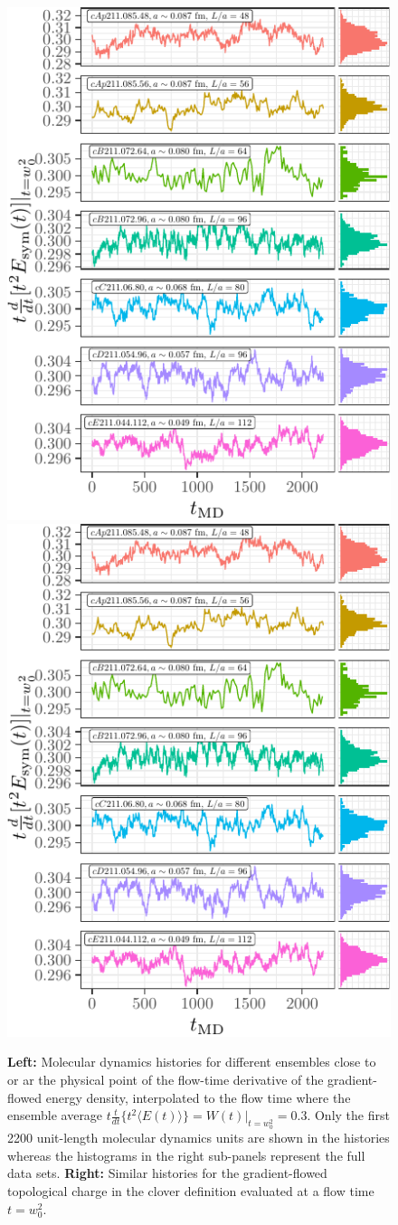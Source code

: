 \documentclass[a4paper,11pt]{article}
\begin{document}
\begin{figure}
  \includegraphics[width=0.49\linewidth,page=1]{../data/gf_observables/gf_observables_md_histories}
  \hfill
  \includegraphics[width=0.49\linewidth,page=2]{../data/gf_observables/gf_observables_md_histories}
  \caption{\textbf{Left:} Molecular dynamics histories for different ensembles close to or ar the physical point of the flow-time derivative of the gradient-flowed energy density, interpolated to the flow time where the ensemble average $t \frac{t}{dt} \lbrace t^2 \langle E(t) \rangle \rbrace = W(t)|_{t = w_0^2} = 0.3$. Only the first 2200 unit-length molecular dynamics units are shown in the histories whereas the histograms in the right sub-panels represent the full data sets. \textbf{Right:} Similar histories for the gradient-flowed topological charge in the clover definition evaluated at a flow time $t = w_0^2$.}
\end{figure}
\end{document}
